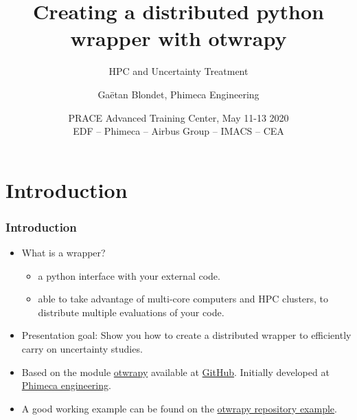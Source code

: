\documentclass[10pt, aspectratio=169]{beamer}
\title{Creating a distributed python wrapper with otwrapy}
\subtitle{HPC and Uncertainty Treatment}
\author[G. Blondet]{Gaëtan Blondet, Phimeca Engineering}
\date[OtWraPy - May 11-13 2020]{PRACE Advanced Training Center, May 11-13 2020\\EDF – Phimeca – Airbus Group – IMACS – CEA}
\begin{document}
\begin{frame}[plain]
  \titlepage
\end{frame}

\begin{frame}{\tableofcontentstitle}
  \tableofcontents[hideallsubsections]
\end{frame}

\label{sec-1}
\section{Introduction}

\begin{frame}
\frametitle{Introduction}
\begin{itemize}
\item What is a wrapper?
	\begin{itemize}
		\item a python interface with your external code.
		\item able to take advantage of multi-core computers and HPC clusters, to distribute multiple evaluations of your code.
  	\end{itemize}
  	
\item Presentation goal: Show you how to create a distributed wrapper to efficiently carry on uncertainty studies.

\item Based on the module \href{http://openturns.github.io/otwrapy/master/index.html}{otwrapy} available at \href{https://github.com/openturns/otwrapy}{GitHub}. Initially developed at \href{http://www.phimeca.com}{Phimeca engineering}.
\item A good working example can be found on the  \href{https://github.com/openturns/otwrapy/tree/master/otwrapy/examples/beam}{otwrapy repository example}.
\end{itemize}
\end{frame}
\end{document}

